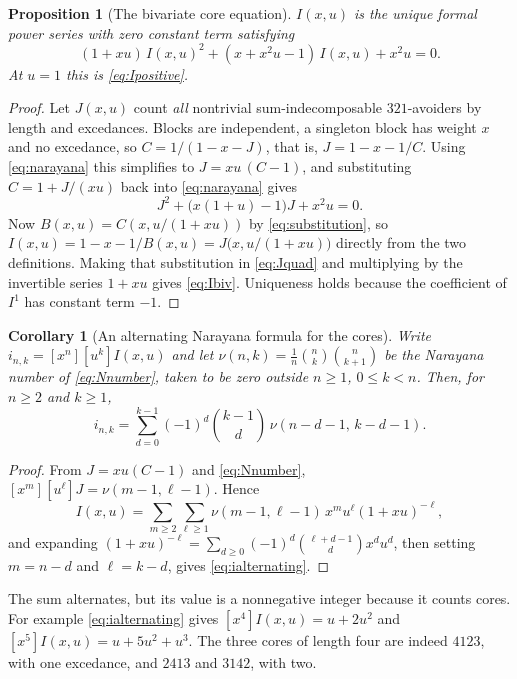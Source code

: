 \documentclass[11pt,letterpaper]{article}
\numberwithin{equation}{section}
\newtheorem{proposition}[theorem]{Proposition}
\newtheorem{corollary}[theorem]{Corollary}
\theoremstyle{definition}
\newcommand{\coeff}[2]{[#1^{#2}]}
\begin{document}
\begin{proposition}[The bivariate core equation]
\label{prop:corequation}
$I(x,u)$ is the unique formal power series with zero constant term
satisfying
\begin{equation}
 (1+xu)\,I(x,u)^2+(x+x^2u-1)\,I(x,u)+x^2u=0.
 \label{eq:Ibiv}
\end{equation}
At $u=1$ this is \eqref{eq:Ipositive}.
\end{proposition}
\begin{proof}
Let $J(x,u)$ count \emph{all} nontrivial sum-indecomposable
$321$-avoiders by length and excedances. Blocks are independent, a
singleton block has weight $x$ and no excedance, so $C=1/(1-x-J)$, that
is, $J=1-x-1/C$. Using \eqref{eq:narayana} this simplifies to
$J=xu\,(C-1)$, and substituting $C=1+J/(xu)$ back into
\eqref{eq:narayana} gives
\begin{equation}
 J^2+\bigl(x(1+u)-1\bigr)J+x^2u=0.
 \label{eq:Jquad}
\end{equation}
Now $B(x,u)=C(x,u/(1+xu))$ by \eqref{eq:substitution}, so
$I(x,u)=1-x-1/B(x,u)=J\bigl(x,u/(1+xu)\bigr)$ directly from the two
definitions. Making that substitution in
\eqref{eq:Jquad} and multiplying by the invertible series $1+xu$ gives
\eqref{eq:Ibiv}. Uniqueness holds because the coefficient of $I^1$ has
constant term $-1$.
\end{proof}

\begin{corollary}[An alternating Narayana formula for the cores]
\label{cor:alternating}
Write $i_{n,k}=\coeff{x}{n}\coeff{u}{k}I(x,u)$ and let
$\nu(n,k)=\frac1n\binom nk\binom n{k+1}$ be the Narayana number of
\eqref{eq:Nnumber}, taken to be zero outside $n\ge1$, $0\le k<n$.
Then, for $n\ge2$ and $k\ge1$,
\begin{equation}
 \boxed{\displaystyle
 i_{n,k}=\sum_{d=0}^{k-1}(-1)^d\binom{k-1}d\,\nu(n-d-1,\,k-d-1).}
 \label{eq:ialternating}
\end{equation}
\end{corollary}
\begin{proof}
From $J=xu(C-1)$ and \eqref{eq:Nnumber},
$\coeff{x}{m}\coeff{u}{\ell}J=\nu(m-1,\ell-1)$. Hence
\[
 I(x,u)=\sum_{m\ge2}\sum_{\ell\ge1}
   \nu(m-1,\ell-1)\,x^mu^\ell(1+xu)^{-\ell},
\]
and expanding $(1+xu)^{-\ell}=\sum_{d\ge0}(-1)^d\binom{\ell+d-1}dx^du^d$,
then setting $m=n-d$ and $\ell=k-d$, gives \eqref{eq:ialternating}.
\end{proof}

The sum alternates, but its value is a nonnegative integer because it
counts cores. For example \eqref{eq:ialternating} gives
$\coeff{x}{4}I(x,u)=u+2u^2$ and
$\coeff{x}{5}I(x,u)=u+5u^2+u^3$. The three cores of length four are
indeed $4123$, with one excedance, and $2413$ and $3142$, with two.
\end{document}
